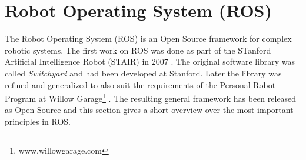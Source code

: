 


\section{Robot Operating System (ROS)}
\label{ros_overview}
The Robot Operating System (ROS) is an Open Source framework for complex robotic systems. The first work on ROS was done as part of the STanford Artificial Intelligence Robot (STAIR) in 2007 \cite{Quigley2007}. The original software library was called \emph{Switchyard} and had been developed at Stanford. Later the library was refined and generalized to also suit the requirements of the Personal Robot Program at Willow Garage\footnote{www.willowgarage.com} \cite{Quigley2009}. The resulting general framework has been released as Open Source \cite{Quigley2009} and this section gives a short overview over the most important principles in ROS.

